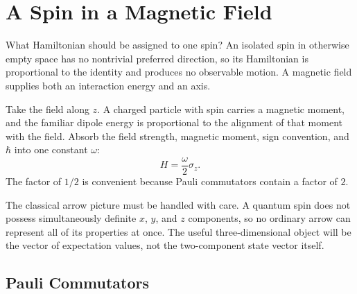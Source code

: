 \begin{classroomqa}
\end{classroomqa}

\section{A Spin in a Magnetic Field}

What Hamiltonian should be assigned to one spin? An isolated spin in otherwise empty space has no nontrivial preferred direction, so its Hamiltonian is proportional to the identity and produces no observable motion. A magnetic field supplies both an interaction energy and an axis.

Take the field along \(z\). A charged particle with spin carries a magnetic moment, and the familiar dipole energy is proportional to the alignment of that moment with the field. Absorb the field strength, magnetic moment, sign convention, and \(\hbar\) into one constant \(\omega\):
\begin{equation}
H=\frac{\omega}{2}\sigma_z.
\label{eq:l5-z-hamiltonian}
\end{equation}
The factor of \(1/2\) is convenient because Pauli commutators contain a factor of \(2\).

The classical arrow picture must be handled with care. A quantum spin does not possess simultaneously definite \(x\), \(y\), and \(z\) components, so no ordinary arrow can represent all of its properties at once. The useful three-dimensional object will be the vector of expectation values, not the two-component state vector itself.

\subsection{Pauli Commutators}

